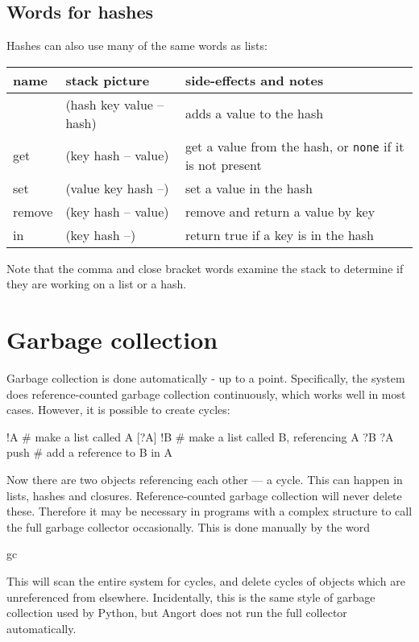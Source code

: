 \subsection{Words for hashes}
Hashes can also use many of the same words as lists:
\begin{center}
\begin{tabular}{|l|l|p{4in}|}\hline
\textbf{name} & \textbf{stack picture} & \textbf{side-effects and notes}\\ \hline
[\%    & (-- hash)    & creates a new hash\\
,    & (hash key value -- hash) & adds a value to the hash\\
]    & (hash key value -- hash) & adds a value to the hash\\
get & (key hash -- value) & get a value from the hash, or \texttt{none} if it is not present\\
set & (value key hash --) & set a value in the hash\\
remove & (key hash -- value) & remove and return a value by key\\
in & (key hash --) & return true if a key is in the hash\\
\hline
\end{tabular}
\end{center}
Note that the comma and close bracket words examine the stack to
determine if they are working on a list or a hash.

\section{Garbage collection}
Garbage collection is done automatically - up to a point. Specifically,
the system does reference-counted garbage collection continuously,
which works well in most cases. However, it is possible to
create cycles:
\begin{v}
    [] !A              # make a list called A
    [?A] !B            # make a list called B, referencing A
    ?B ?A push         # add a reference to B in A
\end{v}
Now there are two objects referencing each other --- a cycle. This can
happen in lists, hashes and closures. Reference-counted garbage
collection will never delete these. Therefore it may be necessary
in programs with a complex structure to call the full garbage collector
occasionally. This is done manually by the word
\begin{v}
    gc
\end{v}
This will scan the entire system for cycles, and delete cycles of
objects which are unreferenced from elsewhere. Incidentally, this is
the same style of garbage collection used by Python, but Angort
does not run the full collector automatically.


